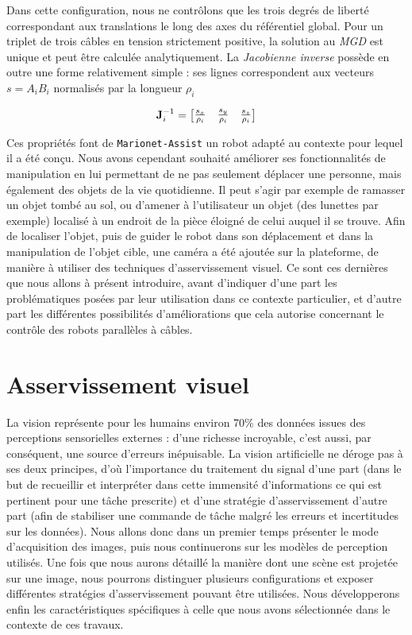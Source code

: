 Dans cette configuration, nous ne contrôlons que les trois degrés de liberté correspondant aux translations le long des axes du référentiel global. Pour un triplet de trois câbles en tension strictement positive, la solution au {\it MGD} est unique et peut être calculée analytiquement. La {\it Jacobienne inverse} possède en outre une forme relativement simple : ses lignes correspondent aux vecteurs $s = A_iB_i$ normalisés par la longueur $\rho_i$

\begin{equation}
{\bf J}^{-1}_i =
\begin{bmatrix}
 \frac {s_x} {\rho_i} & \frac {s_y} {\rho_i} & \frac {s_z} {\rho_i}
\end{bmatrix}
\label{intro:eq11}
\end{equation}

Ces propriétés font de {\tt Marionet-Assist} un robot adapté au contexte pour lequel il a été conçu. Nous avons cependant souhaité améliorer ses fonctionnalités de manipulation en lui permettant de ne pas seulement déplacer une personne, mais également des objets de la vie quotidienne. Il peut s'agir par exemple de ramasser un objet tombé au sol, ou d'amener à l'utilisateur un objet (des lunettes par exemple) localisé à un endroit de la pièce éloigné de celui auquel il se trouve. Afin de localiser l'objet, puis de guider le robot dans son déplacement et dans la manipulation de l'objet cible, une caméra a été ajoutée sur la plateforme, de manière à utiliser des techniques d'asservissement visuel. Ce sont ces dernières que nous allons à présent introduire, avant d'indiquer d'une part les problématiques posées par leur utilisation dans ce contexte particulier, et d'autre part les différentes possibilités d'améliorations que cela autorise concernant le contrôle des robots parallèles à câbles.

\section{Asservissement visuel}

 La vision représente pour les humains environ 70\% des données issues des perceptions sensorielles externes \cite{no} : d'une richesse incroyable, c'est aussi, par conséquent, une source d'erreurs inépuisable. La vision artificielle ne déroge pas à ses deux principes, d'où l'importance du traitement du signal d'une part (dans le but de recueillir et interpréter dans cette immensité d'informations ce qui est pertinent pour une tâche prescrite) et d'une stratégie d'asservissement d'autre part (afin de stabiliser une commande de tâche malgré les erreurs et incertitudes sur les données). Nous allons donc dans un premier temps présenter le mode d'acquisition des images, puis nous continuerons sur les modèles de perception utilisés. Une fois que nous aurons détaillé la manière dont une scène est projetée sur une image, nous pourrons distinguer plusieurs configurations et exposer différentes stratégies d'asservissement pouvant être utilisées. Nous développerons enfin les caractéristiques spécifiques à celle que nous avons sélectionnée dans le contexte de ces travaux.
 
